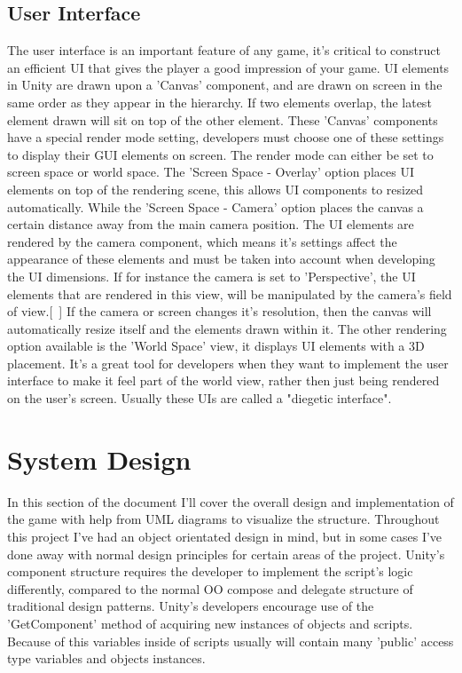 \section{User Interface}
The user interface is an important feature of any game, it's critical to construct an efficient UI that gives the player a good impression of your game. UI elements in Unity are drawn upon a 'Canvas' component, and are drawn on screen in the same order as they appear in the hierarchy. If two elements overlap, the latest element drawn will sit on top of the other element. These 'Canvas' components have a special render mode setting, developers must choose one of these settings to display their GUI elements on screen. The render mode can either be set to screen space or world space. The 'Screen Space - Overlay' option places UI elements on top of the rendering scene, this allows UI components to resized automatically. While the 'Screen Space - Camera' option places the canvas a certain distance away from the main camera position. The UI elements are rendered by the camera component, which means it's settings affect the appearance of these elements and must be taken into account when developing the UI dimensions. If for instance the camera is set to 'Perspective', the UI elements that are rendered in this view, will be manipulated by the camera's field of view.[~\cite{UI-System}] If the camera or screen changes it's resolution, then the canvas will automatically resize itself and the elements drawn within it. The other rendering option available is the 'World Space' view, it displays UI elements with a 3D placement. It's a great tool for developers when they want to implement the user interface to make it feel part of the world view, rather then just being rendered on the user's screen. Usually these UIs are called a "diegetic interface". 
\chapter{System Design}
In this section of the document I'll cover the overall design and implementation of the game with help from UML diagrams to visualize the structure. Throughout this project I've had an object orientated design in mind, but in some cases I've done away with normal design principles for certain areas of the project. Unity's component structure requires the developer to implement the script's logic differently, compared to the normal OO compose and delegate structure of traditional design patterns. Unity's developers encourage use of the 'GetComponent' method of acquiring new instances of objects and scripts. Because of this variables inside of scripts usually will contain many 'public' access type variables and objects instances.
